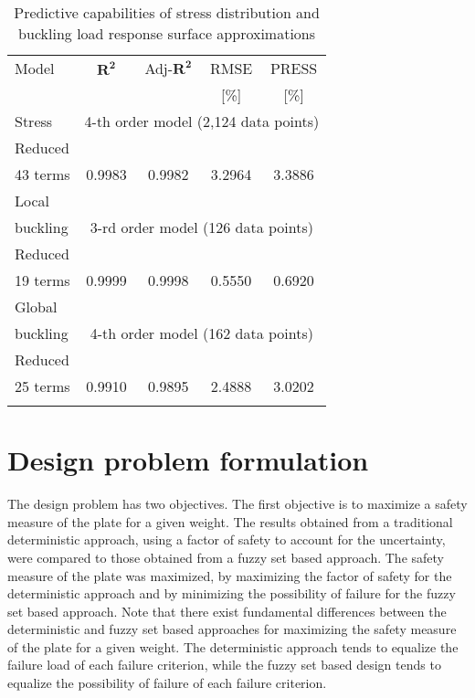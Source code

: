 \documentclass[stropt]{svjour}
\begin{document}
\begin{table}[htbp]
\caption{Predictive capabilities of stress distribution and buckling load
response surface approximations\hsize=178pt}
\label{tab:2}
\begin{tabular}{@{}lcccc@{}}
\hline\noalign{\smallskip}
{Model} & ${\mathbf{R^2}}$ & {Adj-}$\mathbf{R^2}$ &{RMSE}&{PRESS}\\
&&&{[\%]}&{[\%]}  \\
\noalign{\smallskip}\hline\noalign{\smallskip}
{Stress} & \multicolumn{4}{c}{{4-th order model (2,124 data
   points)}} \\
\noalign{\smallskip}\hline\noalign{\smallskip}
Reduced\\
43 terms& 0.9983 & 0.9982 & 3.2964   & 3.3886 \\
{Local}\\
{buckling}&\multicolumn{4}{c}{{3-rd order model (126 data points)}} \\
\noalign{\smallskip}\hline\noalign{\smallskip}
Reduced\\
19 terms& 0.9999 & 0.9998 & 0.5550   & 0.6920 \\
{Global}\\
 {buckling}&   \multicolumn{4}{c}{{4-th order model (162 data points)}} \\
\noalign{\smallskip}\hline\noalign{\smallskip}
Reduced\\
 25 terms& 0.9910 & 0.9895 & 2.4888
   & 3.0202 \\
\noalign{\smallskip}\hline
\end{tabular}
\end{table}


\section{Design problem formulation}
\label{sec05}

The design problem has two objectives.
The first objective is to maximize a safety measure of the plate for a given
weight.
The results obtained from a traditional deterministic approach, using a factor
of safety to account for the uncertainty, were compared to those obtained from
a fuzzy set based approach.
The safety measure of the plate was maximized, by maximizing the factor of
safety for the deterministic approach and by minimizing the possibility of
failure for the fuzzy set based approach.
Note that there exist fundamental differences between the deterministic and
fuzzy set based approaches for maximizing the safety measure of the plate for
a given weight.
The deterministic approach tends to equalize the failure load of each failure
criterion, while the fuzzy set based design tends to equalize the possibility
of failure of each failure criterion.
\end{document}
